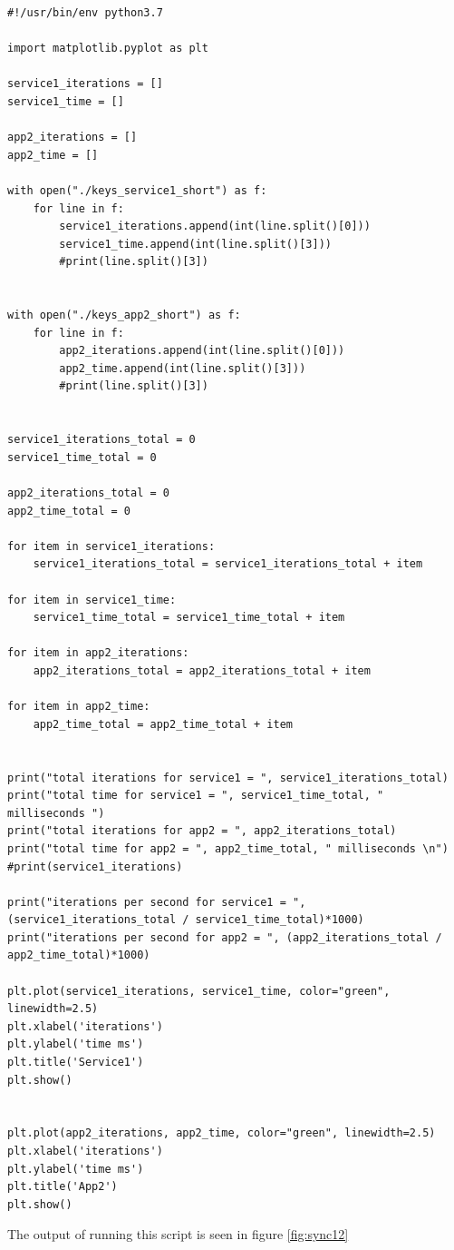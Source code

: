 \begin{lstlisting}
#!/usr/bin/env python3.7

import matplotlib.pyplot as plt

service1_iterations = []
service1_time = []

app2_iterations = []
app2_time = []

with open("./keys_service1_short") as f:
	for line in f:
		service1_iterations.append(int(line.split()[0]))
		service1_time.append(int(line.split()[3]))
		#print(line.split()[3])


with open("./keys_app2_short") as f:
	for line in f:
		app2_iterations.append(int(line.split()[0]))
		app2_time.append(int(line.split()[3]))
		#print(line.split()[3])


service1_iterations_total = 0
service1_time_total = 0

app2_iterations_total = 0
app2_time_total = 0

for item in service1_iterations:
	service1_iterations_total = service1_iterations_total + item

for item in service1_time:
	service1_time_total = service1_time_total + item

for item in app2_iterations:
	app2_iterations_total = app2_iterations_total + item

for item in app2_time:
	app2_time_total = app2_time_total + item		


print("total iterations for service1 = ", service1_iterations_total)
print("total time for service1 = ", service1_time_total, " milliseconds ")
print("total iterations for app2 = ", app2_iterations_total)
print("total time for app2 = ", app2_time_total, " milliseconds \n")
#print(service1_iterations)

print("iterations per second for service1 = ", (service1_iterations_total / service1_time_total)*1000)
print("iterations per second for app2 = ", (app2_iterations_total / app2_time_total)*1000)

plt.plot(service1_iterations, service1_time, color="green", linewidth=2.5)
plt.xlabel('iterations')
plt.ylabel('time ms')
plt.title('Service1')
plt.show()


plt.plot(app2_iterations, app2_time, color="green", linewidth=2.5)
plt.xlabel('iterations')
plt.ylabel('time ms')
plt.title('App2')
plt.show()
\end{lstlisting}
The output of running this script is seen in figure \ref{fig:sync12}

